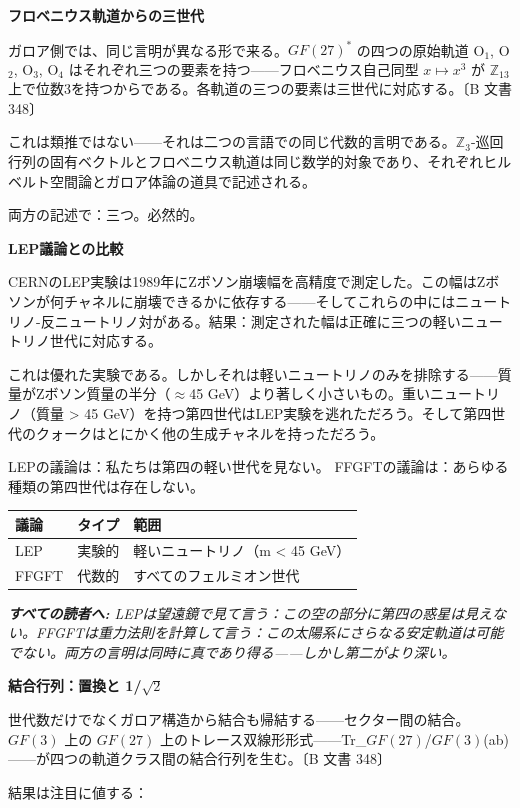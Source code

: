 \documentclass[11pt,openany]{book}
\newenvironment{laierspur}{%
  \par\vspace{4pt}%
  \noindent\small\itshape\color{blue!60!black}%
  \textbf{すべての読者へ:}\enspace\ignorespaces}{%
  \par\vspace{4pt}\normalsize\normalfont\normalcolor}
\begin{document}
\textbf{フロベニウス軌道からの三世代}

ガロア側では、同じ言明が異なる形で来る。$GF(27)^*$ の四つの原始軌道 O$_1$, O$_2$, O$_3$, O$_4$ はそれぞれ三つの要素を持つ——フロベニウス自己同型 $x \mapsto x^3$ が $\mathbb{Z}_{13}$ 上で位数3を持つからである。各軌道の三つの要素は三世代に対応する。〔B 文書 348〕

これは類推ではない——それは二つの言語での同じ代数的言明である。$\mathbb{Z}_3$-巡回行列の固有ベクトルとフロベニウス軌道は同じ数学的対象であり、それぞれヒルベルト空間論とガロア体論の道具で記述される。

両方の記述で：三つ。必然的。

\textbf{LEP議論との比較}

CERNのLEP実験は1989年にZボソン崩壊幅を高精度で測定した。この幅はZボソンが何チャネルに崩壊できるかに依存する——そしてこれらの中にはニュートリノ-反ニュートリノ対がある。結果：測定された幅は正確に三つの軽いニュートリノ世代に対応する。

これは優れた実験である。しかしそれは軽いニュートリノのみを排除する——質量がZボソン質量の半分（$\approx$45 GeV）より著しく小さいもの。重いニュートリノ（質量 > 45 GeV）を持つ第四世代はLEP実験を逃れただろう。そして第四世代のクォークはとにかく他の生成チャネルを持っただろう。

LEPの議論は：私たちは第四の軽い世代を見ない。
FFGFTの議論は：あらゆる種類の第四世代は存在しない。

\begin{tabular}{lll}
\toprule
議論 & タイプ & 範囲 \\
\midrule
LEP & 実験的 & 軽いニュートリノ（m < 45 GeV） \\
FFGFT & 代数的 & すべてのフェルミオン世代 \\
\bottomrule
\end{tabular}

\begin{laierspur}
LEPは望遠鏡で見て言う：この空の部分に第四の惑星は見えない。FFGFTは重力法則を計算して言う：この太陽系にさらなる安定軌道は可能でない。両方の言明は同時に真であり得る——しかし第二がより深い。
\end{laierspur}

\textbf{結合行列：置換と 1/$\sqrt{2}$}

世代数だけでなくガロア構造から結合も帰結する——セクター間の結合。$GF(3)$ 上の $GF(27)$ 上のトレース双線形形式——Tr\_{$GF(27)$/$GF(3)$}(ab)——が四つの軌道クラス間の結合行列を生む。〔B 文書 348〕

結果は注目に値する：
\end{document}
